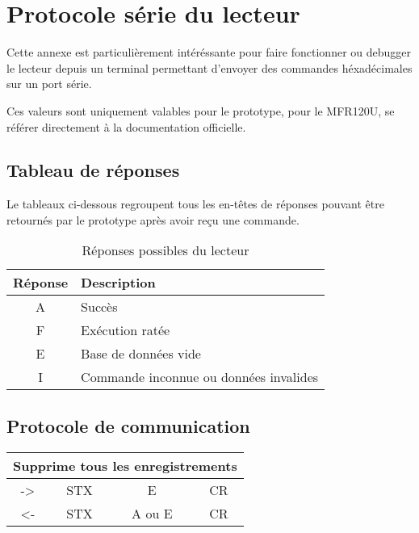 \chapter{Protocole série du lecteur}

    Cette annexe est particulièrement intéréssante pour faire fonctionner ou debugger
le lecteur depuis un terminal permettant d'envoyer des commandes héxadécimales sur
un port série. 

    Ces valeurs sont uniquement valables pour le prototype, pour le MFR120U, se 
référer directement à la documentation officielle.

\section{Tableau de réponses}

    Le tableaux ci-dessous regroupent tous les en-têtes de réponses pouvant être
retournés par le prototype après avoir reçu une commande.

\begin{table}[h]
\begin{center}

    \begin{tabular}{|c|M{3cm}|}
    \hline
    Réponse & Description \tabularnewline
    \hline
    A & Succès \tabularnewline
    \hline
    F & Exécution ratée \tabularnewline
    \hline
    E & Base de données vide \tabularnewline
    \hline
    I & Commande inconnue ou données invalides \tabularnewline
    \hline
    \end{tabular}

\end{center}
\caption{Réponses possibles du lecteur}
\label{Réponses possibles du lecteur}
\end{table}





\newpage
\section{Protocole de communication}

\begin{table}[h]
\begin{center}
    \begin{tabular}{|c|c|c|c|c|}
    \hline
    \multicolumn{5}{|c|}{Supprime tous les enregistrements} \\
    \hline
    -> & STX & \multicolumn{2}{c|}{E} & CR \\
    \hline
    <- & STX & \multicolumn{2}{c|}{A ou E} & CR \\
    \hline
    \end{tabular} 
\end{center}
\end{table}

